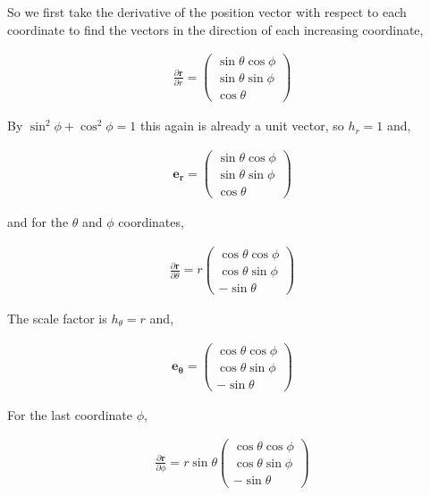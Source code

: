 \documentclass[11pt]{amsart}
\begin{document}
So we first take the derivative of the position vector with respect to each coordinate to find the vectors in the direction of each increasing coordinate,

\begin{align*}
  \frac{\partial\mathbf{r}}{\partial r} =
  \begin{pmatrix}
    \sin\theta\cos\phi \\
    \sin\theta\sin\phi \\
    \cos\theta
  \end{pmatrix}
\end{align*}

By $\sin^2\phi + \cos^2\phi = 1$ this again is already a unit vector, so $h_r = 1$ and,

\begin{align*}
  \mathbf{e_r} =
  \begin{pmatrix}
    \sin\theta\cos\phi \\
    \sin\theta\sin\phi \\
    \cos\theta
  \end{pmatrix}
\end{align*}

and for the $\theta$ and $\phi$ coordinates,

\begin{align*}
  \frac{\partial\mathbf{r}}{\partial\theta} = r
  \begin{pmatrix}
    \cos\theta\cos\phi \\
    \cos\theta\sin\phi \\
    -\sin\theta
  \end{pmatrix}
\end{align*}

The scale factor is $h_{\theta} = r$ and,

\begin{align*}
  \mathbf{e_{\theta}} =
  \begin{pmatrix}
    \cos\theta\cos\phi \\
    \cos\theta\sin\phi \\
    -\sin\theta
  \end{pmatrix}
\end{align*}

For the last coordinate $\phi$,

\begin{align*}
  \frac{\partial\mathbf{r}}{\partial\phi} = r\sin\theta
  \begin{pmatrix}
    \cos\theta\cos\phi \\
    \cos\theta\sin\phi \\
    -\sin\theta
  \end{pmatrix}
\end{align*}
\end{document}
